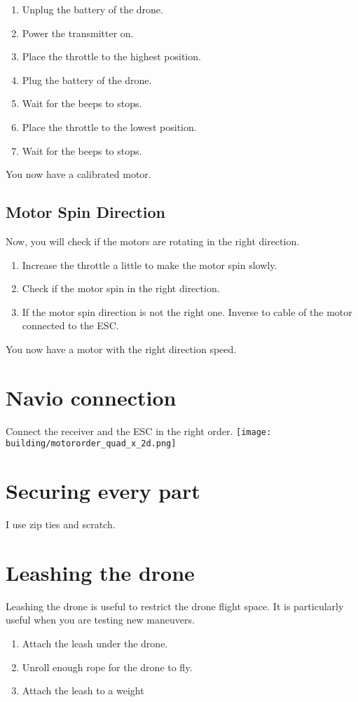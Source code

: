             \begin{enumerate}
                \item Unplug the battery of the drone.
                \item Power the transmitter on.
                \item Place the throttle to the highest position.
                \item Plug the battery of the drone.
                \item Wait for the beeps to stops.
                \item Place the throttle to the lowest position.
                \item Wait for the beeps to stops.
            \end{enumerate}
            You now have a calibrated motor.
        
        
        \subsection{Motor Spin Direction}
            Now, you will check if the motors are rotating in the right direction.
            
            \begin{enumerate}
                \item Increase the throttle a little to make the motor spin slowly.
                \item Check if the motor spin in the right direction.
                \item If the motor spin direction is not the right one. Inverse to cable of the motor connected to the ESC.
            \end{enumerate}
            
            You now have a motor with the right direction speed.
            
    \section{Navio connection}
        Connect the receiver and the ESC in the right order.
        \texttt{[image: building/motororder\_quad\_x\_2d.png]}
        
    \section{Securing every part}
        I use zip ties and scratch.
    
        
    \section{Leashing the drone}
        Leashing the drone is useful to restrict the drone flight space. It is particularly useful when you are testing new maneuvers.
        \begin{enumerate}
            \item Attach the leash under the drone.
            \item Unroll enough rope for the drone to fly.
            \item Attach the leash to a weight
        \end{enumerate}